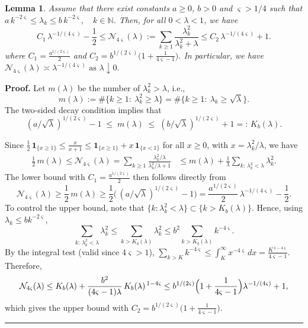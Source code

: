 \documentclass[12pt]{article}
\newtheorem{lemma}[theorem]{Lemma}
\newenvironment{proof}[1][Proof]{\noindent\textbf{#1.} }{\ \rule{0.5em}{0.5em}}
\numberwithin{equation}{section}
\numberwithin{theorem}{section}
\begin{document}
 \begin{lemma}\label{lemma:effdim_Bd}
Assume that there exist constants $a\geq 0$, $b>0$ and $\varsigma>1/4$ such that
$ a\,k^{-2\varsigma} \le \lambda_k \le  b\,k^{-2\varsigma}, \quad k\in\mathbb N$. 
Then, for all $0<\lambda<1$, we have  
\[
C_1\,\lambda^{-1/(4\varsigma)}-\frac1 2
 \le 
\mathcal{N}_{4\varsigma}(\lambda) := \sum_{k\ge1}\frac{\lambda^2_k}{\lambda^2_k+\lambda}
 \le 
C_2\,\lambda^{-1/(4\varsigma)}+1.
\]
where $C_1 = \frac{a^{1/(2\varsigma)}}{2}$
and $C_2 = b^{1/(2\varsigma)}\Big(1+\frac{1}{4\varsigma-1}\Big)$. 
In particular, we have 
$\mathcal{N}_{4\varsigma}(\lambda) \asymp \lambda^{-1/(4\varsigma)} \text{ as }\lambda\downarrow 0.$ 
\end{lemma}

\begin{proof}
Let $m(\lambda)$ be the number of $\lambda^2_k>\lambda$, i.e.,
$$m(\lambda) := \#\{k\ge1:\ \lambda^2_k\ge \lambda\}=\#\{k\ge1:\ \lambda_k\ge \sqrt{\lambda}\}.$$  
The two-sided decay condition implies that 
\[
(a/\sqrt{\lambda})^{1/(2\varsigma)}-1
\;\le\;
m(\lambda)
\;\le\;
(b/\sqrt{\lambda})^{1/(2\varsigma)}+1
=:\,K_b(\lambda).
\tag{1}
\]

\noindent Since $\frac12\,\mathbf 1_{\{x\ge1\}}  \le  \frac{x}{x+1}  \le 
\mathbf 1_{\{x\ge1\}} + x\,\mathbf 1_{\{x<1\}}$ for all $x\ge0$, with $x=\lambda_k^2/\lambda$, we have 
\begin{align*}
\frac12\,m(\lambda)  \le \mathcal{N}_{4\varsigma}(\lambda) = \sum_{k\ge1}\frac{\lambda_k^2/\lambda}{\lambda_k^2/\lambda+1}
& \le 
m(\lambda)+\frac{1}{\lambda}\sum_{k:\,\lambda_k^2<\lambda}\lambda_k^2.
\end{align*}
The lower bound with $C_1  = \frac{a^{1/(2\varsigma)}}{2}$ then follows directly from 
\[
\mathcal{N}_{4\varsigma}(\lambda) \ge \frac12\,m(\lambda)
 \ge \frac12\Big(\,(a/\sqrt{\lambda})^{1/(2\varsigma)}-1\Big)
 = \frac{a^{1/(2\varsigma)}}{2}\,\lambda^{-1/(4\varsigma)}-\frac12.
\]
To control the upper bound, note that $\{k:\lambda_k^2<\lambda\}\subset\{k>K_b(\lambda)\}$. Hence, using $\lambda_k\le b k^{-2\varsigma}$,
\[
\sum_{k:\,\lambda_k^2<\lambda}\lambda_k^2
\le
\sum_{k>K_b(\lambda)}\lambda_k^2
\le
b^2\sum_{k>K_b(\lambda)}k^{-4\varsigma}.
\]
By the integral test (valid since $4\varsigma>1$),
$\sum_{k>K}k^{-4\varsigma}\le \int_K^\infty x^{-4\varsigma}\,dx
=\frac{K^{\,1-4\varsigma}}{4\varsigma-1}$. Therefore,
\[
\mathcal{N}_{4\varsigma}(\lambda)
 \le 
K_b(\lambda)+\frac{b^2}{(4\varsigma-1)\lambda}\,K_b(\lambda)^{\,1-4\varsigma}
 \le 
b^{1/(2\varsigma)}\Bigl(1+\frac{1}{4\varsigma-1}\Bigr)\lambda^{-1/(4\varsigma)}+1, 
\]
which gives the upper bound with $C_2= b^{1/(2\varsigma)}\Big(1+\frac{1}{4\varsigma-1}\Big) $. 
\end{proof}

\makeatletter
\let\origthebibliography\thebibliography
\renewcommand{\thebibliography}[1]{%
    \origthebibliography{#1}%
    \setlength{\itemsep}{0.2pt}%
}
\makeatother
{\small 


} 
\end{document}

